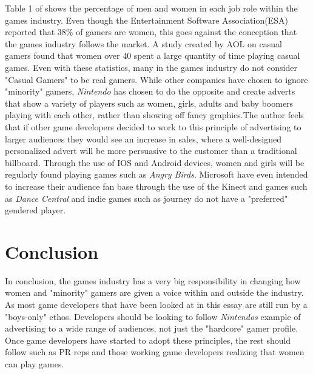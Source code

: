 \documentclass[11pt]{scrartcl}
\begin{document}
Table 1 of \cite{prescott2011segregation} shows the percentage of men and women in each job role within the games industry. Even though the Entertainment Software Association(ESA) reported that 38\% of gamers are women, this goes against the conception that the games industry follows the market\cite{fron2007hegemony}. A study created by AOL on casual gamers found that women over 40 spent a large quantity of time playing casual games.\cite{pearce2008truth} Even with these statistics, many in the games industry do not consider "Casual Gamers" to be real gamers. While other companies have chosen to ignore "minority" gamers, \emph{Nintendo} has chosen to do the opposite and create adverts that show a variety of players such as women, girls, adults and baby boomers playing with each other, rather than showing off fancy graphics\cite{surowiecki_2017}.The author feels that if other game developers decided to work to this principle of advertising to larger audiences they would see an increase in sales, where a well-designed personalized advert will be more persuasive to the customer than a traditional billboard\cite{shannon2009profiling}. Through the use of IOS and Android devices, women and girls will be regularly found playing games such as \emph{Angry Birds}. Microsoft have even intended to increase their audience fan base through the use of the Kinect and games such as \emph{Dance Central} and indie games such as journey do not have a "preferred" gendered player.\cite{consalvo2012confronting} 

\section{Conclusion}
In conclusion, the games industry has a very big responsibility in changing how women and "minority" gamers are given a voice within and outside the industry. As most game developers that have been looked at in this essay are still run by a "boys-only" ethos\cite{marriott_2003}. Developers should be looking to follow \emph{Nintendos} example of advertising to a wide range of audiences, not just the "hardcore" gamer profile. Once game developers have started to adopt these principles, the rest should follow such as PR reps and those working game developers realizing that women can play games.





\end{document}
